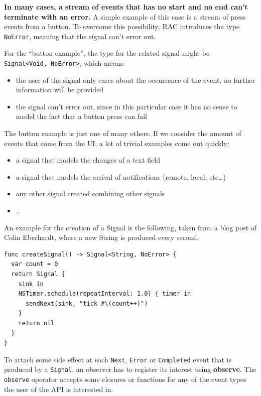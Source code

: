 \textbf{In many cases, a stream of events that has no start and no end
can't terminate with an error.} A simple example of this case is a
stream of press events from a button. To overcome this possibility, RAC
introduces the type \texttt{NoError}, meaning that the signal can't
error out.

For the ``button example'', the type for the related signal might be
\texttt{Signal\textless{}Void,\ NoError\textgreater{}}, which means:

\begin{itemize}
\itemsep1pt\parskip0pt
\item
  the user of the signal only cares about the occurrence of the event, no
  further information will be provided
\item
  the signal can't error out, since in this particular case it has no
  sense to model the fact that a button press can fail
\end{itemize}

The button example is just one of many others. If we consider the amount
of events that come from the UI, a lot of trivial examples come out
quickly:

\begin{itemize}
\itemsep1pt\parskip0pt
\item
  a signal that models the changes of a text field
\item
  a signal that models the arrival of notifications (remote, local,
  etc\ldots{})
\item
  any other signal created combining other signals
\item
  \ldots{}
\end{itemize}

An example for the creation of a Signal is the following, taken from a
blog post of Colin Eberhardt, where a new String is produced every
second.

\begin{verbatim}
func createSignal() -> Signal<String, NoError> {
  var count = 0
  return Signal {
    sink in
    NSTimer.schedule(repeatInterval: 1.0) { timer in
      sendNext(sink, "tick #\(count++)")
    }
    return nil
  }
}
\end{verbatim}

To attach some side effect at each \texttt{Next}, \texttt{Error} or
\texttt{Completed} event that is produced by a \texttt{Signal}, an
observer has to register its interest using \textbf{observe}. The
\texttt{observe} operator accepts some closures or functions for any of
the event types the user of the API is interested in.

